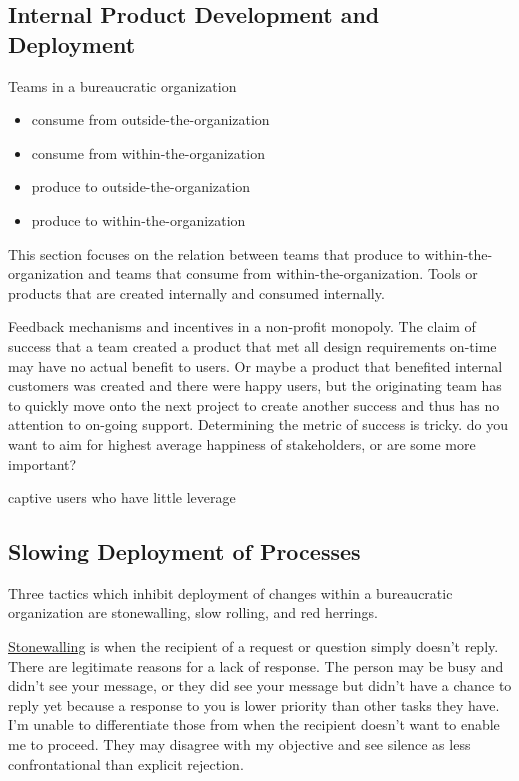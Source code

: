\subsection*{Internal Product Development and Deployment\label{sec:internal-product}}

Teams in a bureaucratic organization 
\begin{itemize}
    \item consume from outside-the-organization
    \item consume from within-the-organization
    \item produce to outside-the-organization
    \item produce to within-the-organization
\end{itemize}

This section focuses on the relation between teams that produce to within-the-organization and teams that consume from within-the-organization. Tools or products that are created internally and consumed internally.

Feedback mechanisms and incentives in a non-profit monopoly. The claim of success that a team created a product that met all design requirements on-time may have no actual benefit to users. Or maybe a product that benefited internal customers was created and there were happy users, but the originating team has to quickly move onto the next project to create another success and thus has no attention to on-going support. Determining the metric of success is tricky. do you want to aim for highest average happiness of stakeholders, or are some more important?

captive users who have little leverage 


\subsection*{Slowing Deployment of Processes\label{sec:slow-deployment}}

Three tactics which inhibit deployment of changes within a bureaucratic organization are stonewalling, slow rolling, and red herrings. 

\underline{Stonewalling} is when the recipient of a request or question simply doesn't reply. There are legitimate reasons for a lack of response. The person may be busy and didn't see your message, or they did see your message but didn't have a chance to reply yet because a response to you is lower priority than other tasks they have. I'm unable to differentiate those from when the recipient doesn't want to enable me to proceed. They may disagree with my objective and see silence as less confrontational than explicit rejection. 

